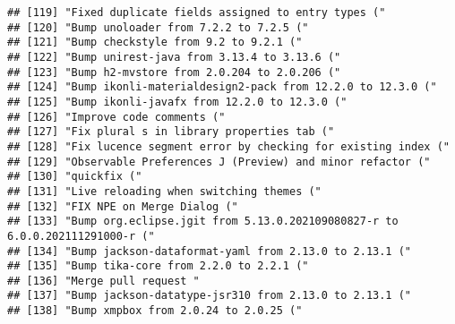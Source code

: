 \documentclass[
]{article}
\begin{document}
\begin{verbatim}
## [119] "Fixed duplicate fields assigned to entry types ("                                                                           
## [120] "Bump unoloader from 7.2.2 to 7.2.5 ("                                                                                       
## [121] "Bump checkstyle from 9.2 to 9.2.1 ("                                                                                        
## [122] "Bump unirest-java from 3.13.4 to 3.13.6 ("                                                                                  
## [123] "Bump h2-mvstore from 2.0.204 to 2.0.206 ("                                                                                  
## [124] "Bump ikonli-materialdesign2-pack from 12.2.0 to 12.3.0 ("                                                                   
## [125] "Bump ikonli-javafx from 12.2.0 to 12.3.0 ("                                                                                 
## [126] "Improve code comments ("                                                                                                    
## [127] "Fix plural s in library properties tab ("                                                                                   
## [128] "Fix lucence segment error by checking for existing index ("                                                                 
## [129] "Observable Preferences J (Preview) and minor refactor ("                                                                    
## [130] "quickfix ("                                                                                                                 
## [131] "Live reloading when switching themes ("                                                                                     
## [132] "FIX NPE on Merge Dialog ("                                                                                                  
## [133] "Bump org.eclipse.jgit from 5.13.0.202109080827-r to 6.0.0.202111291000-r ("                                                 
## [134] "Bump jackson-dataformat-yaml from 2.13.0 to 2.13.1 ("                                                                       
## [135] "Bump tika-core from 2.2.0 to 2.2.1 ("                                                                                       
## [136] "Merge pull request "                                                                                                        
## [137] "Bump jackson-datatype-jsr310 from 2.13.0 to 2.13.1 ("                                                                       
## [138] "Bump xmpbox from 2.0.24 to 2.0.25 ("                                                                                        

\end{verbatim}
\end{document}
